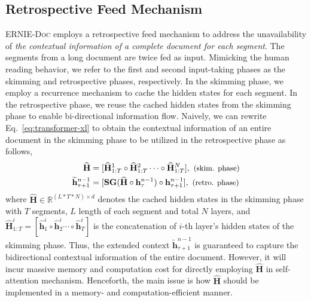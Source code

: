 \documentclass[11pt,a4paper]{article}
\newcommand{\mname}{\textsc{ERNIE-Doc}\xspace}
\begin{document}
\subsection{Retrospective Feed Mechanism}\label{sec:recur-input}

\mname employs a retrospective feed mechanism to address the unavailability of \textit{the contextual information of a complete document for each segment}. The segments from a long document are twice fed as input. Mimicking the human reading behavior, we refer to the first and second input-taking phases as the skimming and retrospective phases, respectively. In the skimming phase, we employ a recurrence mechanism to cache the hidden states for each segment. In the retrospective phase, we reuse the cached hidden states from the skimming phase to enable bi-directional information flow. Naively, we can rewrite Eq.~\ref{eq:transformer-xl} to obtain the contextual information of an entire document in the skimming phase to be utilized in the retrospective phase as follows,
\begin{equation}
\begin{aligned}
    \mathbf{\widehat{H}} &= [\mathbf{\widehat{H}}_{1:T}^{1} \circ \mathbf{\widehat{H}}_{1:T}^{2} \cdots \circ \mathbf{\widehat{H}}_{1:T}^{N}], \text{  \small (skim. phase)} \\
    \widetilde{\mathbf{h}}_{\tau+1}^{n-1} &= [ \mathrm{\textbf{SG}}(\mathbf{\widehat{H}} \circ \mathbf{h}_{\tau}^{n-1}) \circ \mathbf{h}_{\tau+1}^{n-1}], \text{  \small (retro. phase)}
\end{aligned}\label{eq:recurrent-input}
\end{equation}
where $\mathbf{\widehat{H}} \in \mathbb{R}^{(L*T*N) \times d}$ denotes the cached hidden states in the skimming phase with $T$ segments, $L$ length of each segment and total $N$ layers, and     $\mathbf{\widehat{H}}_{1:T}^i = [\mathbf{\widehat{h}}_{1}^{i} \circ \mathbf{\widehat{h}}_{2}^{i} \cdots \circ \mathbf{\widehat{h}}_{T}^{i}]$ is the concatenation of $i$-th layer's hidden states of the skimming phase. Thus, the extended context $\widetilde{\mathbf{h}}_{\tau+1}^{n-1}$ is guaranteed to capture the bidirectional contextual information of the entire document. However, it will incur massive memory and computation cost for directly employing $\mathbf{\widehat{H}}$ in self-attention mechanism. Henceforth, the main issue is how $\mathbf{\widehat{H}}$ should be implemented in a memory- and computation-efficient manner. 
\end{document}
